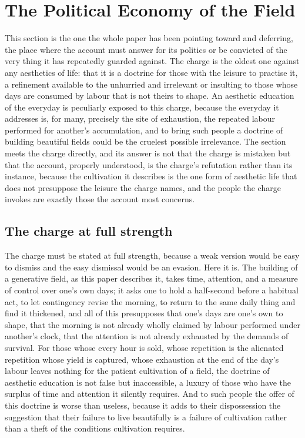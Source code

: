 \section{The Political Economy of the Field}
\label{p22:sec:political-economy}

\noindent
This section is the one the whole paper has been pointing toward and deferring, the place where the account must answer for its politics or be convicted of the very thing it has repeatedly guarded against. The charge is the oldest one against any aesthetics of life: that it is a doctrine for those with the leisure to practise it, a refinement available to the unhurried and irrelevant or insulting to those whose days are consumed by labour that is not theirs to shape. An aesthetic education of the everyday is peculiarly exposed to this charge, because the everyday it addresses is, for many, precisely the site of exhaustion, the repeated labour performed for another's accumulation, and to bring such people a doctrine of building beautiful fields could be the cruelest possible irrelevance. The section meets the charge directly, and its answer is not that the charge is mistaken but that the account, properly understood, is the charge's refutation rather than its instance, because the cultivation it describes is the one form of aesthetic life that does not presuppose the leisure the charge names, and the people the charge invokes are exactly those the account most concerns.

\subsection{The charge at full strength}
\label{p22:sub:pe-charge}

The charge must be stated at full strength, because a weak version would be easy to dismiss and the easy dismissal would be an evasion. Here it is. The building of a generative field, as this paper describes it, takes time, attention, and a measure of control over one's own days; it asks one to hold a half-second before a habitual act, to let contingency revise the morning, to return to the same daily thing and find it thickened, and all of this presupposes that one's days are one's own to shape, that the morning is not already wholly claimed by labour performed under another's clock, that the attention is not already exhausted by the demands of survival. For those whose every hour is sold, whose repetition is the alienated repetition whose yield is captured, whose exhaustion at the end of the day's labour leaves nothing for the patient cultivation of a field, the doctrine of aesthetic education is not false but inaccessible, a luxury of those who have the surplus of time and attention it silently requires. And to such people the offer of this doctrine is worse than useless, because it adds to their dispossession the suggestion that their failure to live beautifully is a failure of cultivation rather than a theft of the conditions cultivation requires.

